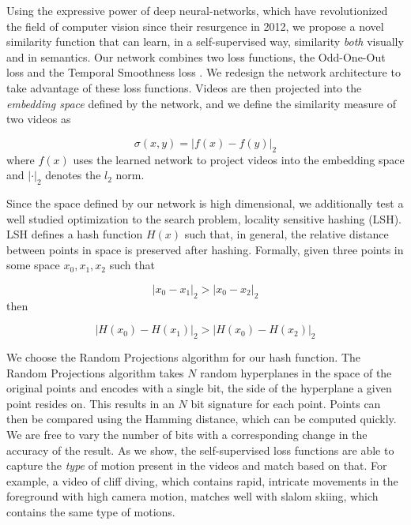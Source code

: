 Using the expressive power of deep neural-networks, which have revolutionized the field of computer vision since their resurgence in 2012, we propose a novel similarity function that can learn, in a self-supervised way, similarity \textit{both} visually and in semantics. Our network combines two loss functions, the Odd-One-Out loss \cite{fernando2017self} and the Temporal Smoothness loss \cite{goroshin2015unsupervised, jayaraman2016slow}. We redesign the network architecture to take advantage of these loss functions. Videos are then projected into the \textit{embedding space} defined by the network, and we define the similarity measure of two videos as 

\begin{equation*}
\sigma(x, y) =|f(x) - f(y)|_2
\end{equation*}
where $f(x)$ uses the learned network to project videos into the embedding space and $|\cdot|_2$ denotes the $l_2$ norm. 

Since the space defined by our network is high dimensional, we additionally test a well studied optimization to the search problem, locality sensitive hashing (LSH). LSH defines a hash function $H(x)$ such that, in general, the relative distance between points in space is preserved after hashing. Formally, given three points in some space $x_0, x_1, x_2$ such that 

\begin{equation*}
|x_0 - x_1|_2 > |x_0 - x_2|_2
\end{equation*}
then

\begin{equation*}
|H(x_0) - H(x_1)|_2 > |H(x_0) - H(x_2)|_2
\end{equation*}

We choose the Random Projections algorithm \cite{charikar2002similarity} for our hash function. The Random Projections algorithm takes $N$ random hyperplanes in the space of the original points and encodes with a single bit, the side of the hyperplane a given point resides on. This results in an $N$ bit signature for each point. Points can then be compared using the Hamming distance, which can be computed quickly. We are free to vary the number of bits with a corresponding change in the accuracy of the result. As we show, the self-supervised loss functions are able to capture the \textit{type} of motion present in the videos and match based on that. For example, a video of cliff diving, which contains rapid, intricate movements in the foreground with high camera motion, matches well with slalom skiing, which contains the same type of motions.
